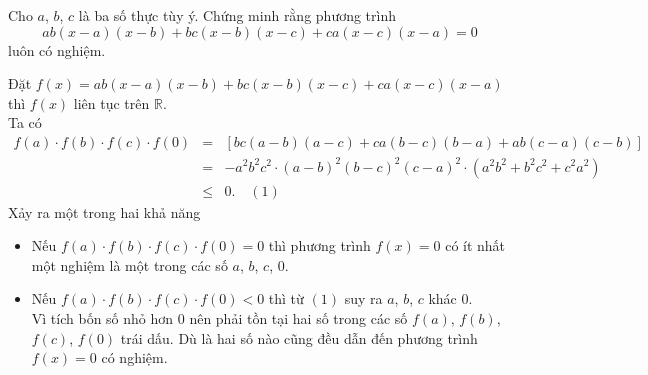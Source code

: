 \begin{bt}%
	Cho $a$, $b$, $c$ là ba số thực tùy ý. Chứng minh rằng phương trình
	\[ab(x-a)(x-b)+bc(x-b)(x-c)+ca(x-c)(x-a)=0\] luôn có nghiệm.
	\loigiai
	{Đặt $f(x)=ab(x-a)(x-b)+bc(x-b)(x-c)+ca(x-c)(x-a)$ thì $f(x)$ liên tục trên $\mathbb{R}$.\\ 
		Ta có 
		\begin{eqnarray*}
			f(a)\cdot f(b)\cdot f(c)\cdot f(0)&=&\left[bc(a-b)(a-c)+ca(b-c)(b-a)+ab(c-a)(c-b)\right]\\
			&=&-a^2 b^2c^2\cdot (a-b)^2(b-c)^2(c-a)^2\cdot \left(a^2b^2+b^2c^2+c^2a^2\right)\\
			&\le & 0.\quad (1)
		\end{eqnarray*}
		Xảy ra một trong hai khả năng
		\begin{itemize}
			\item[•] Nếu $f(a)\cdot f(b)\cdot f(c)\cdot f(0)=0$ thì phương trình $f(x)=0$ có ít nhất một nghiệm là một trong các số $a$, $b$, $c$, $0$.
			\item[•] Nếu $f(a)\cdot f(b)\cdot f(c)\cdot f(0)<0$ thì từ $(1)$ suy ra $a$, $b$, $c$ khác $0$.\\
			Vì tích bốn số nhỏ hơn $0$ nên phải tồn tại hai số trong các số $f(a)$, $ f(b)$, $f(c)$, $f(0)$ trái dấu. Dù là hai số nào cũng đều dẫn đến phương trình $f(x)=0$ có nghiệm.
		\end{itemize}
	}
\end{bt}


